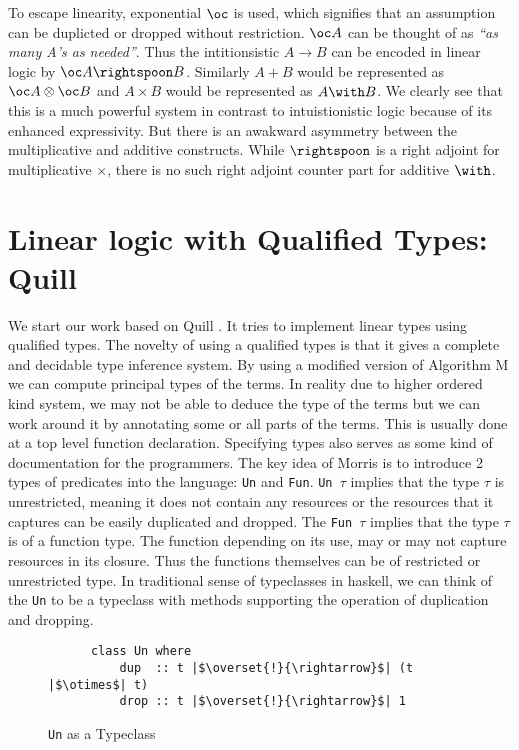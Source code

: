 To escape linearity, exponential $\oc$ is used, which signifies that an assumption can
be duplicted or dropped without restriction. $\oc A$ can be thought of as {\em``as many A's as needed''}.
Thus the intitionsistic $A \rightarrow B$ can be encoded in linear logic by $\oc A \rightspoon B$.
Similarly $A \plus B$ would be represented as $\oc A \otimes \oc B$ and $A \times B$ would be represented as $A \with B$.
We clearly see that this is a much powerful system in contrast to intuistionistic logic because of its enhanced expressivity.
But there is an awakward asymmetry between the multiplicative and additive constructs. While $\rightspoon$ is a right adjoint
for multiplicative $\times$, there is no such right adjoint counter part for additive $\with$.
\section{Linear logic with Qualified Types: Quill}
We start our work based on Quill \citep{morris_best_2016}. It tries
to implement linear types using qualified types. The novelty of using a qualified
types is that it gives a complete and decidable type inference system. By using
a modified version of Algorithm M we can compute principal types of the terms.
In reality due to higher ordered kind system, we may not be able to deduce the
type of the terms but we can work around it by annotating some or all parts of
the terms. This is usually done at a top level function declaration. Specifying types
also serves as some kind of documentation for the programmers.
The key idea of Morris is to introduce 2 types of predicates into the language: \texttt{Un} and \texttt{Fun}.
\texttt{Un $\tau$} implies that the type $\tau$ is unrestricted, meaning it does not
contain any resources or the resources that it captures can be easily duplicated and dropped.
The \texttt{Fun $\tau$} implies that the type $\tau$ is of a function type. The function
depending on its use, may or may not capture resources in its closure. Thus the functions
themselves can be of restricted or unrestricted type. In traditional sense of typeclasses
in haskell, we can think of the \texttt{Un} to be a typeclass with methods supporting the operation
of duplication and dropping.
\begin{figure}[h]
  \centering
  \begin{framed}
    \begin{verbatim}
      class Un where
          dup  :: t |$\overset{!}{\rightarrow}$| (t |$\otimes$| t)
          drop :: t |$\overset{!}{\rightarrow}$| 1
    \end{verbatim}
  \end{framed}
  \caption{\texttt{Un} as a Typeclass}
  \label{fig:un-typeclass}
\end{figure}

